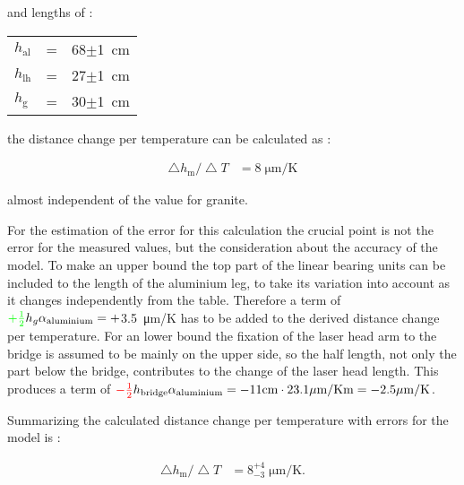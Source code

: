 \documentclass[
a4paper,                                %
twoside,                                %
BCOR1.4cm,                      %
10pt,                           %
headings=normal,                %
headsepline,                    %
clearplainpage, %
final,                                  %
div=14,
parskip=full,
openright,
bibliography=toc
]{scrreprt}
\begin{document}
and lengths of :

\begin{table}[H]
\centering	 
\begin{tabular}{lcr}
	$h_{\mathrm{al}}$ & = & 68$\pm$\SI{1}{\cm}
	\\
	$h_{\mathrm{lh}}$ & = & 27$\pm$\SI{1}{\cm}
	\\
	$h_{\mathrm{g}}$ & = & 30$\pm$\SI{1}{\cm}
\end{tabular}
\end{table}

the distance change per temperature can be calculated as : 

\begin{align*}
	\bigtriangleup h_{\mathrm{m}} /\!\bigtriangleup\!T &= 8\;\mathrm{\mu m / K}
\end{align*}

almost independent of the value for granite.

For the estimation of the error for this calculation the crucial point is not the error for the measured values, but the consideration about the accuracy of the model. To make an upper bound the top part of the linear bearing units can be included to the length of the aluminium leg, to take its variation into account as it changes independently from the table. Therefore a term of ${\color{green}+ \tfrac{1}{2}} h_{g} \alpha_{\mathrm{aluminium}} = +$\SI{3.5}{\micro\m/\K} has to be added to the derived distance change per temperature. For an lower bound the fixation of the laser head arm to the bridge is assumed to be mainly on the upper side, so the half length, not only the part below the bridge, contributes to the change of the laser head length. This produces a term of ${\color{red}- \tfrac{1}{2}}h_{\mathrm{bridge}} \alpha_{\mathrm{aluminium}} = - 11 \mathrm{cm} \cdot 23.1 \mathrm{\mu m/Km} = - 2.5 \mathrm{\mu m/K}$. 

Summarizing the calculated distance change per temperature with errors for the model is :

\begin{align*}
	\bigtriangleup h_{\mathrm{m}} /\!\bigtriangleup\!T &= 8_{-3}^{+4}\;\mathrm{\mu m / K}.
\end{align*}
\end{document}
